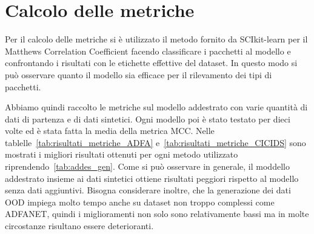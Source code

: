 \section{Calcolo delle metriche}

Per il calcolo delle metriche si è utilizzato il metodo fornito da SCIkit-learn per il Matthews Correlation Coefficient facendo classificare i pacchetti al modello e confrontando i risultati con le etichette effettive del dataset. In questo modo si può osservare quanto il modello sia efficace per il rilevamento dei tipi di pacchetti.

Abbiamo quindi raccolto le metriche sul modello addestrato con varie quantità di dati di partenza e di dati sintetici. Ogni modello poi è stato testato per dieci volte ed è stata fatta la media della metrica MCC. Nelle tablelle~\ref{tab:risultati_metriche_ADFA} e~\ref{tab:risultati_metriche_CICIDS} sono mostrati i migliori risultati ottenuti per ogni metodo utilizzato riprendendo~\ref{tab:addes_gen}. Come si può osservare in generale, il moddello addestrato insieme ai dati sintetici ottiene risultati peggiori rispetto al modello senza dati aggiuntivi. Bisogna considerare inoltre, che la generazione dei dati OOD impiega molto tempo  anche su dataset non troppo complessi come ADFANET, quindi i miglioramenti non solo sono relativamente bassi ma in molte circostanze risultano essere deterioranti.


\begin{table}\centering\setlength\tabcolsep{3.5pt}\renewcommand{}
  \noindent{}
\caption{\label{tab:risultati_metriche_ADFA} Risultati migliori ottenuti per ogni metodo sul dataset ADFANET}
\end{table}

